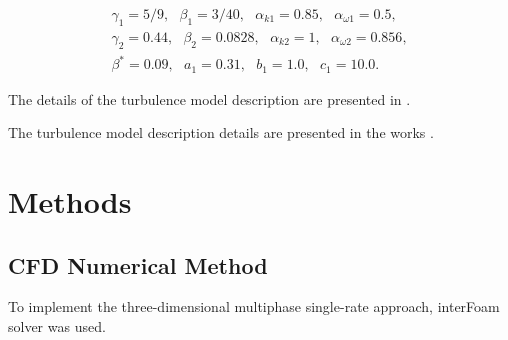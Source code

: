 \documentclass[sensors,article,submit,moreauthors,pdftex]{Definitions/mdpi}
\begin{document}
\begin{equation}
	\label{kOmegaSstConstantsInit}
	\begin{aligned}
		\gamma_1 = 5 / 9,\ \ \ \beta_1 = 3 / 40,\ \ \ \alpha_{k1} = 0.85,\ \ \ \alpha_{\omega1} = 0.5,\\
		\gamma_2 = 0.44,\ \ \ \beta_2 = 0.0828,\ \ \ \alpha_{k2} = 1,\ \ \ \alpha_{\omega 2} = 0.856,\\
		\beta^* = 0.09,\ \ \ a_1 = 0.31,\ \ \ b_1 = 1.0,\ \ \ c_1 = 10.0.
	\end{aligned}
\end{equation}

The details of the turbulence model description are presented in \cite{Menter1993, MenterKuntzLangtry2003}.

The turbulence model description details are presented in the works \cite{Menter1993, MenterKuntzLangtry2003}.


 
\section{Methods}
\subsection{CFD Numerical Method}

To implement the three-dimensional multiphase single-rate approach, interFoam solver was used.
\end{document}
